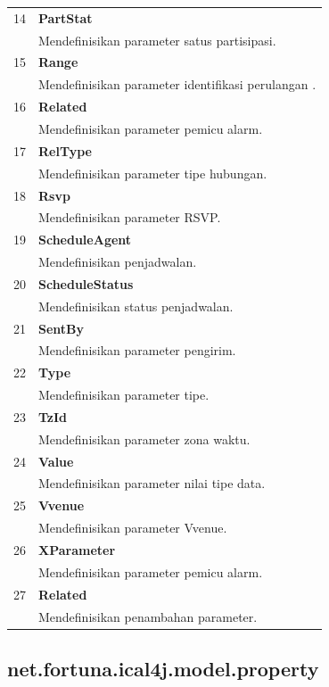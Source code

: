 \begin{tabular}{|c|p{12cm}|}
		14 & \textbf{PartStat}\\
			&	Mendefinisikan parameter satus partisipasi.\\ \hline
		15 & \textbf{Range}\\
			&	Mendefinisikan parameter identifikasi perulangan .\\ \hline
		16 & \textbf{Related}\\
			&	Mendefinisikan parameter pemicu alarm.\\ \hline
		17 & \textbf{RelType}\\
			&	Mendefinisikan parameter tipe hubungan.\\ \hline
		18 & \textbf{Rsvp}\\
			&	Mendefinisikan parameter RSVP.\\ \hline
		19 & \textbf{ScheduleAgent}\\
			&	Mendefinisikan penjadwalan.\\ \hline
		20 & \textbf{ScheduleStatus}\\
			&	Mendefinisikan status penjadwalan.\\ \hline
		21 & \textbf{SentBy}\\
			&	Mendefinisikan parameter pengirim.\\ \hline
		22 & \textbf{Type}\\
			&	Mendefinisikan parameter tipe.\\ \hline
		23 & \textbf{TzId}\\
			&	Mendefinisikan parameter zona waktu.\\ \hline
		24 & \textbf{Value}\\
			&	Mendefinisikan parameter nilai tipe data.\\ \hline
		25 & \textbf{Vvenue}\\
			&	Mendefinisikan parameter Vvenue.\\ \hline
		26 & \textbf{XParameter}\\
			&	Mendefinisikan parameter pemicu alarm.\\ \hline
		27 & \textbf{Related}\\
			&	Mendefinisikan penambahan parameter.\\ \hline
	\end{tabular}

\subsection{net.fortuna.ical4j.model.property}

